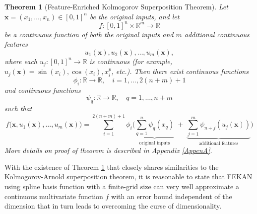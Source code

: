 \documentclass{article}
\newtheorem{theorem}{Theorem}
\begin{document}
\begin{theorem} [Feature-Enriched Kolmogorov Superposition Theorem] \label{th1:main} 
Let \(\mathbf{x} = (x_1, \dots, x_n) \in [0,1]^n\) be the original inputs, and let
\[
f: [0,1]^n \times \mathbb{R}^m \to \mathbb{R}
\] 
be a continuous function of both the original inputs and \(m\) additional continuous features
\[
u_1(\mathbf{x}), u_2(\mathbf{x}), \dots, u_m(\mathbf{x}),
\]
where each \(u_j: [0,1]^n \to \mathbb{R}\) is continuous (for example, \(u_j(\mathbf{x}) = \sin(x_i), \cos(x_i), x_i^p \), etc.). Then there exist continuous functions
\[
\phi_i: \mathbb{R} \to \mathbb{R}, \quad i = 1, \dots, 2(n+m)+1
\]
and continuous functions
\[
\psi_q: \mathbb{R} \to \mathbb{R}, \quad q = 1, \dots, n+m
\]
such that\\
\begin{equation}
\label{eq:kolmogorov-features-explicit}
\boxed{
f\big(\mathbf{x}, u_1(\mathbf{x}), \dots, u_m(\mathbf{x})\big) 
= \sum_{i=1}^{2(n+m)+1} 
\phi_i \Bigg(
\underbrace{\sum_{q=1}^{n} \psi_q(x_q)}_{\text{original inputs}} \;+\; 
\underbrace{\sum_{j=1}^{m} \psi_{n+j}(u_j(\mathbf{x}))}_{\text{additional features}}
\Bigg)
}
\end{equation}
More details on proof of theorem is described in Appendix \ref{AppenA}.
\end{theorem}

With the existence of Theorem \ref{th1:main} that closely shares similarities to the Kolmogorov-Arnold superposition theorem, it is reasonable to state that FEKAN using spline basis function with a finite-grid size can very well approximate a continuous multivariate function $f$ with an error bound independent of the dimension that in turn leads to overcoming the curse of dimensionality.
\end{document}
